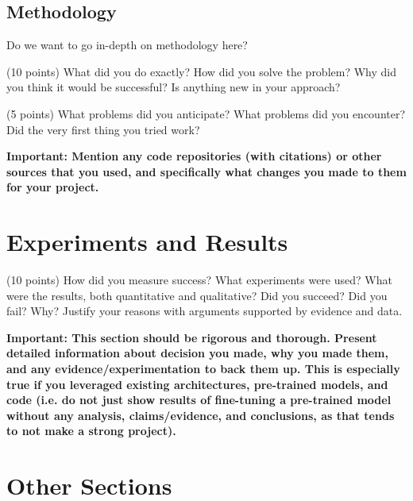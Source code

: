\documentclass[10pt,twocolumn,letterpaper]{article}
\begin{document}
\subsection{Methodology}

Do we want to go in-depth on methodology here?


(10 points) What did you do exactly? How did you solve the problem? Why did you think it would be successful? Is anything new in your approach? 

(5 points) What problems did you anticipate? What problems did you encounter? Did the very first thing you tried work? 

\textbf{Important: Mention any code repositories (with citations) or other sources that you used, and specifically what changes you made to them for your project. }

\section{Experiments and Results}

(10 points) How did you measure success? What experiments were used? What were the results, both quantitative and qualitative? Did you succeed? Did you fail? Why? Justify your reasons with arguments supported by evidence and data.

\textbf{Important: This section should be rigorous and thorough. Present detailed information about decision you made, why you made them, and any evidence/experimentation to back them up. This is especially true if you leveraged existing architectures, pre-trained models, and code (i.e. do not just show results of fine-tuning a pre-trained model without any analysis, claims/evidence, and conclusions, as that tends to not make a strong project). }

\section{Other Sections}
\end{document}

